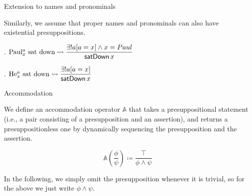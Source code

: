 \documentclass{beamer}
\begin{document}
\begin{frame}{Extension to names and pronominals}

  Similarly, we assume that proper names and pronominals can also have existential presuppositions.

  \ex. $\text{Paul$^{a}_{x}$ sat down} \rightsquigarrow \displaystyle\frac{\exists ! a[a = x] \wedge x = Paul}{\textsf{satDown}\,x}$

  \ex. $\text{He$^{a}_{x}$ sat down} \rightsquigarrow \displaystyle\frac{\exists ! a[a = x]}{\textsf{satDown}\,x}$

\end{frame}

\begin{frame}{Accommodation}

  We define an accommodation operator \(\mathbb{A}\) that takes a presuppositional statement (i.e., a pair consisting of a presupposition and an assertion), and returns a presuppositionless one by dynamically sequencing the presupposition and the assertion.

  \[\mathbb{A}\left(\frac{\phi}{\psi}\right) \coloneq \displaystyle\frac{\top}{\phi \wedge \psi}\]

  In the following, we simply omit the presupposition whenever it is trivial, so for the above we just write \(\phi \wedge \psi\).

\end{frame}
\end{document}
